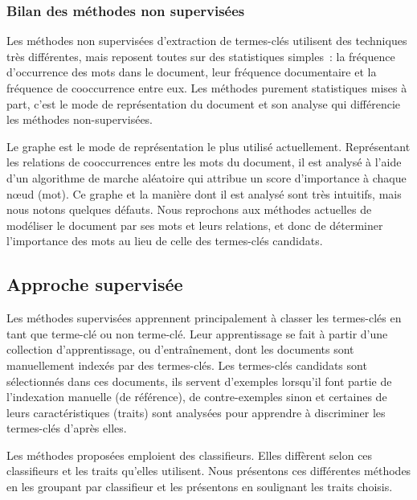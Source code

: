       \subsubsection{Bilan des méthodes non supervisées}
      \label{subsubsec:main-state_of_the_art-automatic_keyphrase_extraction-unsupervised_keyphrase_extraction-bilan}
        Les méthodes non supervisées d'extraction de termes-clés utilisent des
        techniques très différentes, mais reposent toutes sur des statistiques
        simples~: la fréquence d'occurrence des mots dans le document, leur
        fréquence documentaire et la fréquence de cooccurrence entre eux. Les
        méthodes purement statistiques mises à part, c'est le mode de
        représentation du document et son analyse qui différencie les méthodes
        non-supervisées.
        
        Le graphe est le mode de représentation le plus utilisé actuellement.
        Représentant les relations de cooccurrences entre les mots du document,
        il est analysé à l'aide d'un algorithme de marche aléatoire qui attribue
        un score d'importance à chaque n\oe{}ud (mot). Ce graphe et la manière
        dont il est analysé sont très intuitifs, mais nous notons quelques
        défauts. Nous reprochons aux méthodes actuelles de modéliser le document
        par ses mots et leurs relations, et donc de déterminer l'importance des
        mots au lieu de celle des termes-clés candidats.

    \subsection{Approche supervisée}
    \label{subsec:main-state_of_the_art-automatic_keyphrase_extraction-supervised_keyphrase_extraction}
      Les méthodes supervisées apprennent principalement à classer les
      termes-clés en tant que \og{}terme-clé\fg{} ou \og{}non terme-clé\fg{}.
      Leur apprentissage se fait à partir d'une collection d'apprentissage, ou
      d'entraînement, dont les documents sont manuellement indexés par des
      termes-clés. Les termes-clés candidats sont sélectionnés dans ces
      documents, ils servent d'exemples lorsqu'il font partie de l'indexation
      manuelle (de référence), de contre-exemples sinon et certaines de leurs
      caractéristiques (traits) sont analysées pour apprendre à discriminer les
      termes-clés d'après elles.

      Les méthodes proposées emploient des classifieurs. Elles diffèrent selon
      ces classifieurs et les traits qu'elles utilisent. Nous présentons ces
      différentes méthodes en les groupant par classifieur et les présentons en
      soulignant les traits choisis.

